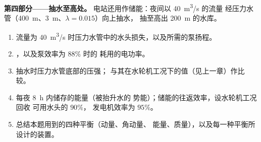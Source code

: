 \begin{problem}
\medskip
\noindent\textbf{第四部分——抽水至高处。}
电站还用作储能：夜间以 \qty{40}{m^3/s} 的流量
经压力水管（\qty{400}{m}、\qty{3}{m}、$\lambda = 0.015$）向上抽水，
抽至高出 \qty{200}{m} 的水库。
\begin{enumerate}[resume]
  \item 流量为 \qty{40}{m^3/s} 时压力水管中的水头损失，以及所需的泵扬程。
  \item {}，以及泵效率为 $88\%$ 时的
        耗用的电功率。
  \item 抽水时压力水管底部的压强；
        与其在水轮机工况下的值（见上一章）作比较。
  \item 每夜 \qty{8}{h} 内储存的能量（被抬升水的
        势能）；储能的往返效率，设水轮机工况回收
        可用水头的 $90\%$，
        发电机效率为 $95\%$。
  \item 总结本题用到的四种平衡（动量、角动量、
        能量、质量），以及每一种平衡所设计的装置。
\end{enumerate}
\end{problem}
